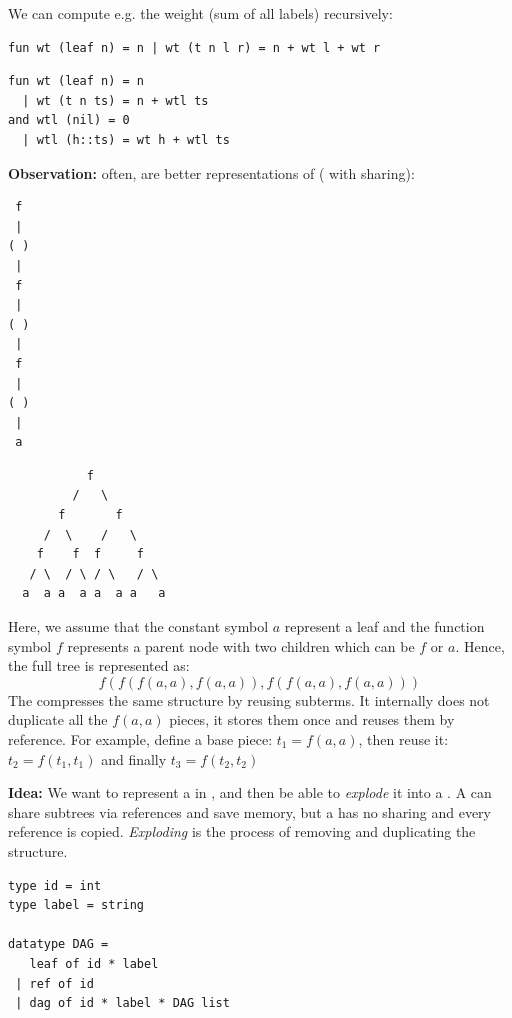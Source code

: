We can compute e.g. the weight (sum of all labels) recursively:
\begin{verbatim}
fun wt (leaf n) = n | wt (t n l r) = n + wt l + wt r
\end{verbatim}

\begin{verbatim}
fun wt (leaf n) = n
  | wt (t n ts) = n + wtl ts
and wtl (nil) = 0
  | wtl (h::ts) = wt h + wtl ts
\end{verbatim}

\textbf{Observation: }often,  are better representations of  ( with sharing):

\begin{minipage}[t]{0.50\textwidth}
\vspace{0pt}
\begin{verbatim}
 f
 |
( )
 |
 f
 |
( )
 |
 f
 |
( )
 |
 a
\end{verbatim}
\end{minipage}%
\hfill
\begin{minipage}[t]{0.50\textwidth}
\vspace{0pt}
\begin{verbatim}
           f
         /   \
       f       f
     /  \    /   \
    f    f  f     f
   / \  / \ / \   / \
  a  a a  a a  a a   a
\end{verbatim}
\end{minipage}

Here, we assume that the constant symbol $a$ represent a leaf and the function symbol $f$ represents a parent node with two children which can be $f$ or $a$. Hence, the full tree is represented as:
\[
f(f(f(a,a),f(a,a)),f(f(a,a),f(a,a)))
\]
The  compresses the same structure by reusing subterms. It internally does not duplicate all the $f(a,a)$ pieces, it stores them once and reuses them by reference. For example, define a base piece: $t_1 = f(a,a)$, then reuse it: $t_2 = f(t_1, t_1)$ and finally $t_3 = f(t_2,t_2)$

\textbf{Idea: }We want to represent a  in , and then be able to \textit{explode} it into a . A  can share subtrees via references and save memory, but a  has no sharing and every reference is copied. \textit{Exploding} is the process of removing and duplicating the structure.


\begin{verbatim}
type id = int
type label = string

datatype DAG = 
   leaf of id * label
 | ref of id
 | dag of id * label * DAG list 
\end{verbatim}

